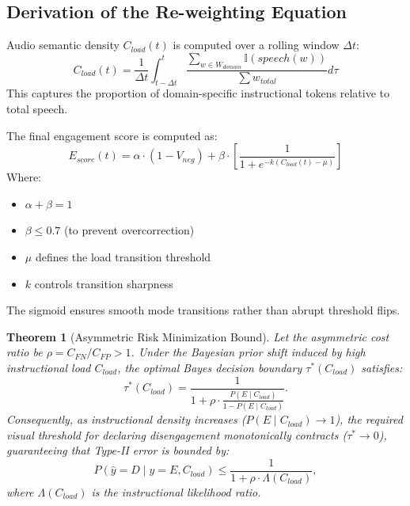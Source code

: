 \documentclass[conference]{IEEEtran}
\newtheorem{theorem}{Theorem}
\begin{document}
\subsection{Derivation of the Re-weighting Equation}
Audio semantic density $C_{load}(t)$ is computed over a rolling window $\Delta t$:
\begin{equation}
C_{load}(t) = \frac{1}{\Delta t} \int_{t-\Delta t}^{t} \frac{\sum_{w \in W_{domain}} \mathbb{I}(speech(w))}{\sum w_{total}} d\tau
\end{equation}
This captures the proportion of domain-specific instructional tokens relative to total speech.

The final engagement score is computed as:
\begin{equation}
E_{score}(t) = \alpha \cdot (1 - V_{neg}) + \beta \cdot \left[ \frac{1}{1 + e^{-k(C_{load}(t) - \mu)}} \right]
\end{equation}
Where:
\begin{itemize}
    \item $\alpha + \beta = 1$
    \item $\beta \leq 0.7$ (to prevent overcorrection)
    \item $\mu$ defines the load transition threshold
    \item $k$ controls transition sharpness
\end{itemize}

The sigmoid ensures smooth mode transitions rather than abrupt threshold flips.

\begin{theorem}[Asymmetric Risk Minimization Bound]
Let the asymmetric cost ratio be $\rho = C_{FN} / C_{FP} > 1$. Under the Bayesian prior shift induced by high instructional load $C_{load}$, the optimal Bayes decision boundary $\tau^*(C_{load})$ satisfies:
\begin{equation}
\tau^*(C_{load}) = \frac{1}{1 + \rho \cdot \frac{P(E \mid C_{load})}{1 - P(E \mid C_{load})}}.
\label{eq:bayes_bound}
\end{equation}
Consequently, as instructional density increases ($P(E \mid C_{load}) \to 1$), the required visual threshold for declaring disengagement monotonically contracts ($\tau^* \to 0$), guaranteeing that Type-II error is bounded by:
\begin{equation}
P(\hat{y}=D \mid y=E, C_{load}) \le \frac{1}{1 + \rho \cdot \Lambda(C_{load})},
\end{equation}
where $\Lambda(C_{load})$ is the instructional likelihood ratio.
\end{theorem}
\end{document}
